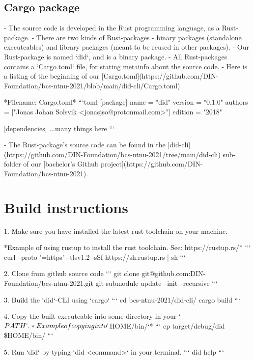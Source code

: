 \subsection{Cargo package}

- The source code is developed in the Rust programming language, as a Rust-package.
- There are two kinds of Rust-packages - binary packages (standalone executeables) and library packages (meant to be reused in other packages).
- Our Rust-package is named `did`, and is a binary package.
- All Rust-packages contains a `Cargo.toml` file, for stating metainfo about the source code.
- Here is a listing of the beginning of our [Cargo.toml](https://github.com/DIN-Foundation/bcs-ntnu-2021/blob/main/did-cli/Cargo.toml)

    *Filename: Cargo.toml*
    ```toml
    [package]
    name = "did"
    version = "0.1.0"
    authors = ["Jonas Johan Solsvik <jonasjso@protonmail.com>"]
    edition = "2018"

    [dependencies]
    ...many things here
    ```

- The Rust-package's source code can be found in the [did-cli](https://github.com/DIN-Foundation/bcs-ntnu-2021/tree/main/did-cli) sub-folder of our [bachelor's Github project](https://github.com/DIN-Foundation/bcs-ntnu-2021).

\section{Build instructions}

1. Make sure you have installed the latest rust toolchain on your machine.

    *Example of using rustup to install the rust toolchain. See: https://rustup.rs/*
    ```
    curl --proto '=https' --tlsv1.2 -sSf https://sh.rustup.rs | sh
    ```

2. Clone from github source code
    ```
    git clone git@github.com:DIN-Foundation/bcs-ntnu-2021.git
    git submodule update --init --recursive
    ```

3. Build the `did`-CLI using `cargo`
    ```
    cd bcs-ntnu-2021/did-cli/
    cargo build
    ```

4. Copy the built executeable into some directory in your `$PATH`.

    *Example of copying into `$HOME/bin/`*
    ```
    cp target/debug/did \$HOME/bin/
    ```

5. Run `did` by typing `did <command>` in your terminal.
    ```
    did help
    ```



